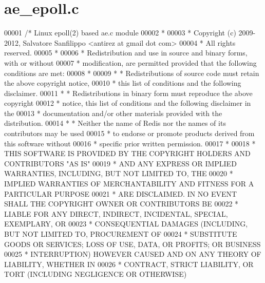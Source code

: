 \hypertarget{ae__epoll_8c_source}{}\section{ae\+\_\+epoll.\+c}
\label{ae__epoll_8c_source}

\begin{DoxyCode}
00001 \textcolor{comment}{/* Linux epoll(2) based ae.c module}
00002 \textcolor{comment}{ *}
00003 \textcolor{comment}{ * Copyright (c) 2009-2012, Salvatore Sanfilippo <antirez at gmail dot com>}
00004 \textcolor{comment}{ * All rights reserved.}
00005 \textcolor{comment}{ *}
00006 \textcolor{comment}{ * Redistribution and use in source and binary forms, with or without}
00007 \textcolor{comment}{ * modification, are permitted provided that the following conditions are met:}
00008 \textcolor{comment}{ *}
00009 \textcolor{comment}{ *   * Redistributions of source code must retain the above copyright notice,}
00010 \textcolor{comment}{ *     this list of conditions and the following disclaimer.}
00011 \textcolor{comment}{ *   * Redistributions in binary form must reproduce the above copyright}
00012 \textcolor{comment}{ *     notice, this list of conditions and the following disclaimer in the}
00013 \textcolor{comment}{ *     documentation and/or other materials provided with the distribution.}
00014 \textcolor{comment}{ *   * Neither the name of Redis nor the names of its contributors may be used}
00015 \textcolor{comment}{ *     to endorse or promote products derived from this software without}
00016 \textcolor{comment}{ *     specific prior written permission.}
00017 \textcolor{comment}{ *}
00018 \textcolor{comment}{ * THIS SOFTWARE IS PROVIDED BY THE COPYRIGHT HOLDERS AND CONTRIBUTORS "AS IS"}
00019 \textcolor{comment}{ * AND ANY EXPRESS OR IMPLIED WARRANTIES, INCLUDING, BUT NOT LIMITED TO, THE}
00020 \textcolor{comment}{ * IMPLIED WARRANTIES OF MERCHANTABILITY AND FITNESS FOR A PARTICULAR PURPOSE}
00021 \textcolor{comment}{ * ARE DISCLAIMED. IN NO EVENT SHALL THE COPYRIGHT OWNER OR CONTRIBUTORS BE}
00022 \textcolor{comment}{ * LIABLE FOR ANY DIRECT, INDIRECT, INCIDENTAL, SPECIAL, EXEMPLARY, OR}
00023 \textcolor{comment}{ * CONSEQUENTIAL DAMAGES (INCLUDING, BUT NOT LIMITED TO, PROCUREMENT OF}
00024 \textcolor{comment}{ * SUBSTITUTE GOODS OR SERVICES; LOSS OF USE, DATA, OR PROFITS; OR BUSINESS}
00025 \textcolor{comment}{ * INTERRUPTION) HOWEVER CAUSED AND ON ANY THEORY OF LIABILITY, WHETHER IN}
00026 \textcolor{comment}{ * CONTRACT, STRICT LIABILITY, OR TORT (INCLUDING NEGLIGENCE OR OTHERWISE)}

\end{DoxyCode}
